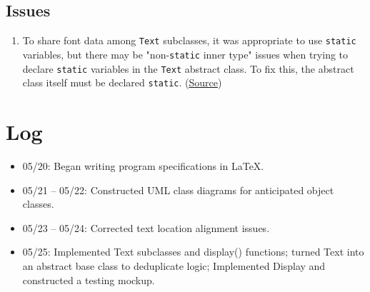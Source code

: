 \documentclass{article}
\begin{document}
\subsection{Issues}
\begin{enumerate}
    \item To share font data among \verb|Text| subclasses, it was appropriate to use \verb|static| variables, but there may be "non-\verb|static| inner type" issues when trying to declare \verb|static| variables in the \verb|Text| abstract class. To fix this, the abstract class itself must be declared \verb|static|. (\href{https://forum.processing.org/two/discussion/23623/when-creating-a-class-what-is-it-an-inner-class-of-declared-static-in-a-non-static-inner-type.html}{Source})
\end{enumerate}

\section{Log}
\begin{itemize}
    \item 05/20: Began writing program specifications in \LaTeX.
    \item 05/21 -- 05/22: Constructed UML class diagrams for anticipated object classes.
    \item 05/23 -- 05/24: Corrected text location alignment issues.
    \item 05/25: Implemented Text subclasses and display() functions; turned Text into an abstract base class to deduplicate logic; Implemented Display and constructed a testing mockup.
\end{itemize}
\end{document}
